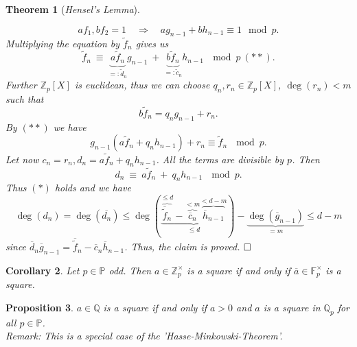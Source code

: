 \documentclass[11pt]{book}
\newtheorem{theorem}{Theorem}[section]
\newtheorem{proposition}[theorem]{Proposition}
\newtheorem{corollary}[theorem]{Corollary}
\theoremstyle{nonumberbreak}
\newenvironment{pr}[1][]{\ifthenelse{\equal{#1}{}}{\proof}{\proof[#1]}\rm}{\endproof}
\begin{document}
\begin{spacing}{1.3}
\begin{theorem}[\rm \it Hensel's Lemma]
\begin{pr}
\begin{compactenum}
$$af_1, bf_2=1 \quad \Longrightarrow \quad ag_{n-1}+bh_{n-1} \equiv 1 \mod p.$$
Multiplying the equation by $\tilde{f}_n$ gives us 
$$\tilde{f}_n \ \equiv \ \underbrace{a \tilde{f}_n}_{=:\tilde{d}_n} g_{n-1} \ + \ \underbrace{b \tilde{f}_{n}}_{=:\tilde{c}_n} h_{n-1} \ \mod p \ (**).$$
Further $\mathbb{Z}_p[X]$ is euclidean, thus we can choose $q_n, r_n \in \mathbb{Z}_p[X]$, $\deg(r_n)<m$ such that
$$b \tilde{f}_n=q_n g_{n-1} + r_n.$$
By $(**)$ we have
$$g_{n-1}\left(a \tilde{f}_n + q_n h_{n-1}\right) + r_n \equiv \tilde{f}_n \ \mod p.$$
Let now $c_n=r_n, d_n=a\tilde{f}_n+q_nh_{n-1}$. All the terms are divisible by $p$. Then
$$d_n \ \equiv\ a \tilde{f}_n \ + \ q_nh_{n-1} \ \mod p.$$
Thus $(*)$ holds and we have
$$\deg(d_n)=\deg(\overline{d_n})\leqslant \deg\left(\underbrace{\overbrace{\overline{\tilde{f}}_n}^{\leqslant d}-\overbrace{\overline{c}_n}^{<m}\overbrace{\overline{h}_{n-1}}^{<d-m}}_{\leqslant d}\right)-\underbrace{\deg(\overline{g}_{n-1})}_{=m} \leqslant d-m$$
since $\overline{d}_n\overline{g}_{n-1}=\overline{\tilde{f}}_n-\overline{c}_n\overline{h}_{n-1}$. Thus, the claim is proved.  $\hfill \Box$
\end{compactenum}
\end{pr}
\end{theorem}

\begin{corollary}%
Let $p\in \mathbb{P}$ odd. Then
$a \in \mathbb{Z}_p^{\times}$ is a square if and only if $\overline{a} \in \mathbb{F}_p^{\times}$ is a square.
\end{corollary}

\begin{proposition}%
$a \in \mathbb{Q}$ is a square if and only if $a>0$ and $a$ is a square in $\mathbb{Q}_p$ for all $p \in \mathbb{P}$. 
\\
\textit{Remark: This is a special case of the 'Hasse-Minkowski-Theorem'. 
}
\end{proposition}




























\end{spacing}
\end{document}
